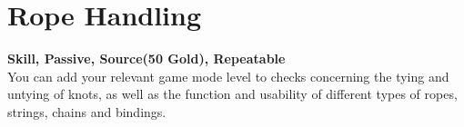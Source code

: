 \section{Rope Handling}\label{sec:ropeHandling}
\textbf{Skill, Passive, Source(50 Gold), Repeatable}\\
You can add your relevant game mode level to checks concerning the tying and untying of knots, as well as the function and usability of different types of ropes, strings, chains and bindings.